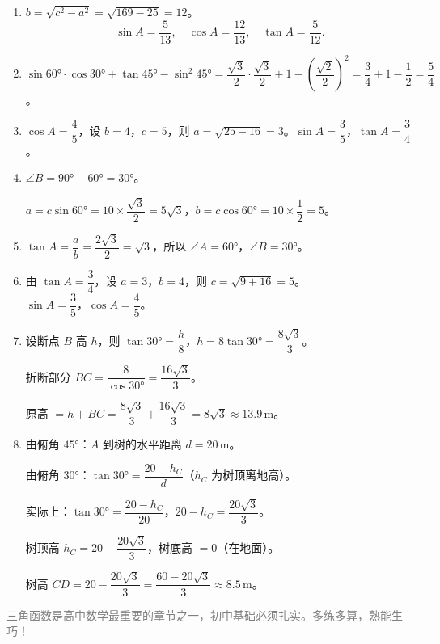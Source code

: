 \documentclass[12pt, a4paper]{ctexart}
\begin{document}
\vspace{10pt}
\begin{knowledgebox}[参考答案]

\begin{enumerate}[leftmargin=2em, itemsep=6pt]

  \item $b = \sqrt{c^2-a^2} = \sqrt{169-25} = 12$。
  \[
  \sin A = \frac{5}{13},\quad \cos A = \frac{12}{13},\quad \tan A = \frac{5}{12}.
  \]

  \item $\sin 60° \cdot \cos 30° + \tan 45° - \sin^2 45°
  = \dfrac{\sqrt{3}}{2} \cdot \dfrac{\sqrt{3}}{2} + 1 - \left(\dfrac{\sqrt{2}}{2}\right)^2
  = \dfrac{3}{4} + 1 - \dfrac{1}{2}
  = \boxed{\dfrac{5}{4}}$。

  \item $\cos A = \dfrac{4}{5}$，设 $b=4$，$c=5$，则 $a = \sqrt{25-16} = 3$。\quad $\sin A = \dfrac{3}{5}$，$\tan A = \dfrac{3}{4}$。

  \item $\angle B = 90°-60° = 30°$。

  $a = c\sin 60° = 10 \times \dfrac{\sqrt{3}}{2} = \boxed{5\sqrt{3}}$，\quad $b = c\cos 60° = 10 \times \dfrac{1}{2} = \boxed{5}$。

  \item $\tan A = \dfrac{a}{b} = \dfrac{2\sqrt{3}}{2} = \sqrt{3}$，所以 $\angle A = 60°$，$\angle B = 30°$。

  \item 由 $\tan A = \dfrac{3}{4}$，设 $a=3$，$b=4$，则 $c=\sqrt{9+16}=5$。\\
  $\sin A = \dfrac{3}{5}$，$\cos A = \dfrac{4}{5}$。

  \item 设断点 $B$ 高 $h$，则 $\tan 30° = \dfrac{h}{8}$，$h = 8\tan 30° = \dfrac{8\sqrt{3}}{3}$。

  折断部分 $BC = \dfrac{8}{\cos 30°} = \dfrac{16\sqrt{3}}{3}$。

  原高 $= h + BC = \dfrac{8\sqrt{3}}{3} + \dfrac{16\sqrt{3}}{3} = 8\sqrt{3} \approx \boxed{13.9\,\text{m}}$。

  \item 由俯角 $45°$：$A$ 到树的水平距离 $d = 20\,\text{m}$。

  由俯角 $30°$：$\tan 30° = \dfrac{20-h_C}{d}$（$h_C$ 为树顶离地高）。

  实际上：$\tan 30° = \dfrac{20-h_C}{20}$，$20-h_C = \dfrac{20\sqrt{3}}{3}$。

  树顶高 $h_C = 20 - \dfrac{20\sqrt{3}}{3}$，树底高 $= 0$（在地面）。

  树高 $CD = 20 - \dfrac{20\sqrt{3}}{3} = \dfrac{60-20\sqrt{3}}{3} \approx \boxed{8.5\,\text{m}}$。

\end{enumerate}
\end{knowledgebox}

\vfill
\begin{center}
\small\textcolor{gray}{三角函数是高中数学最重要的章节之一，初中基础必须扎实。多练多算，熟能生巧！}
\end{center}
\end{document}
